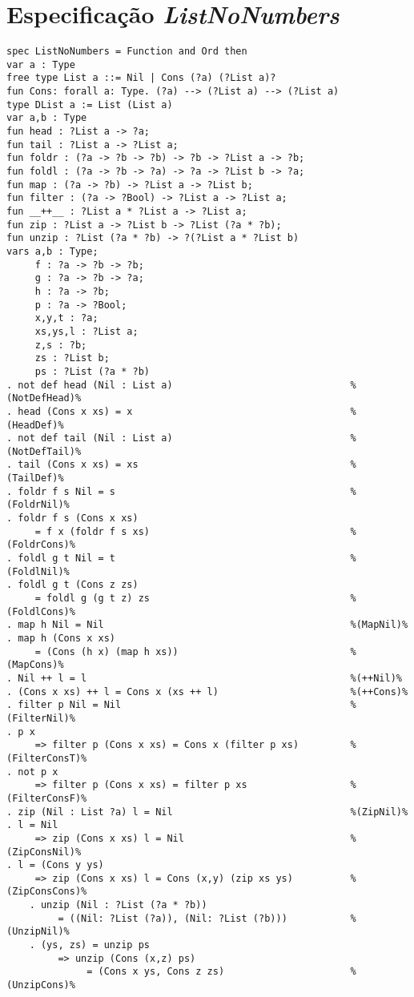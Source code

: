 \section{Especificação \textit{ListNoNumbers}}
\label{appendix:lazySpec:listNoNumbers}
\begin{Verbatim}
spec ListNoNumbers = Function and Ord then
var a : Type
free type List a ::= Nil | Cons (?a) (?List a)?
fun Cons: forall a: Type. (?a) --> (?List a) --> (?List a)
type DList a := List (List a)
var a,b : Type
fun head : ?List a -> ?a;
fun tail : ?List a -> ?List a;
fun foldr : (?a -> ?b -> ?b) -> ?b -> ?List a -> ?b;
fun foldl : (?a -> ?b -> ?a) -> ?a -> ?List b -> ?a;
fun map : (?a -> ?b) -> ?List a -> ?List b;
fun filter : (?a -> ?Bool) -> ?List a -> ?List a;
fun __++__ : ?List a * ?List a -> ?List a;
fun zip : ?List a -> ?List b -> ?List (?a * ?b);
fun unzip : ?List (?a * ?b) -> ?(?List a * ?List b)
vars a,b : Type; 
     f : ?a -> ?b -> ?b; 
     g : ?a -> ?b -> ?a;
     h : ?a -> ?b; 
     p : ?a -> ?Bool; 
     x,y,t : ?a; 
     xs,ys,l : ?List a; 
     z,s : ?b; 
     zs : ?List b; 
     ps : ?List (?a * ?b)
. not def head (Nil : List a)                               %(NotDefHead)%
. head (Cons x xs) = x                                      %(HeadDef)%
. not def tail (Nil : List a)                               %(NotDefTail)%
. tail (Cons x xs) = xs                                     %(TailDef)%
. foldr f s Nil = s                                         %(FoldrNil)%
. foldr f s (Cons x xs) 
     = f x (foldr f s xs)                                   %(FoldrCons)%
. foldl g t Nil = t                                         %(FoldlNil)%
. foldl g t (Cons z zs) 
     = foldl g (g t z) zs                                   %(FoldlCons)%
. map h Nil = Nil                                           %(MapNil)%
. map h (Cons x xs)       
     = (Cons (h x) (map h xs))                              %(MapCons)%
. Nil ++ l = l                                              %(++Nil)%
. (Cons x xs) ++ l = Cons x (xs ++ l)                       %(++Cons)%
. filter p Nil = Nil                                        %(FilterNil)%
. p x  
     => filter p (Cons x xs) = Cons x (filter p xs)         %(FilterConsT)%
. not p x 
     => filter p (Cons x xs) = filter p xs                  %(FilterConsF)%
. zip (Nil : List ?a) l = Nil                               %(ZipNil)%
. l = Nil 
     => zip (Cons x xs) l = Nil                             %(ZipConsNil)%
. l = (Cons y ys) 
     => zip (Cons x xs) l = Cons (x,y) (zip xs ys)          %(ZipConsCons)%
    . unzip (Nil : ?List (?a * ?b)) 
         = ((Nil: ?List (?a)), (Nil: ?List (?b)))           %(UnzipNil)%
    . (ys, zs) = unzip ps 
         => unzip (Cons (x,z) ps) 
              = (Cons x ys, Cons z zs)                      %(UnzipCons)%


\end{Verbatim}
